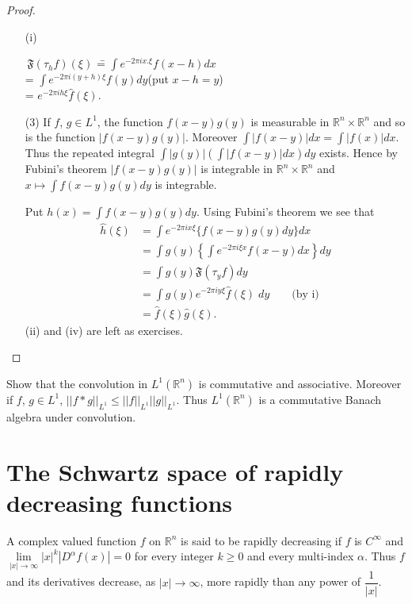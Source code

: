 \begin{proof}
\begin{itemize}
\item[\rm(i)]\pageoriginale
\begin{tabbing}
\,\qquad\quad$\mathfrak{F}(\tau_{h}f)(\xi)$ \== $\int e^{-2\pi
    ix.\xi}f(x-h)dx$\\[3pt]
\>= $\int e^{-2\pi i(y+h)\xi}f(y)dy$\quad (put $x-h=y$)\\[3pt]
\>= $e^{-2\pi ih \xi}\widehat{f}(\xi)$.
\end{tabbing}

(3) If $f$, $g\in L^{1}$, the function $f(x-y)g(y)$ is measurable in
$\mathbb{R}^{n}\times \mathbb{R}^{n}$ and so is the function
$|f(x-y)g(y)|$. Moreover $\int |f(x-y)|dx=\int  |f(x)|dx$. Thus the
repeated integral $\int |g(y)|(\int |f(x-y)|dx)dy$ exists. Hence by
Fubini's theorem $|f(x-y)g(y)|$ is integrable in $\mathbb{R}^{n}\times
  \mathbb{R}^{n}$ and $x\mapsto \int f(x-y)g(y)dy$ is integrable.

Put $h(x)=\int f(x-y)g(y)dy$. Using Fubini's theorem we see that
\begin{align*}
\widehat{h}(\xi) &= \int e^{-2\pi ix\xi}\{f(x-y)g(y)dy\}dx\\[3pt]
&= \int g(y)\left\{\int e^{-2\pi i \xi x}f(x-y)dx\right\}dy\\[3pt]
&= \int g(y)\mathfrak{F}(\tau_{y}f)dy\\[3pt]
&= \int g(y)e^{-2\pi iy\xi}\widehat{f}(\xi)\; dy\quad \text{~~ (by
  i)}\\[3pt]
&= \widehat{f}(\xi)\widehat{g}(\xi).
\end{align*}
(ii) and (iv) are left as exercises.
\end{itemize}
\end{proof}

\begin{exer*}
Show that the convolution in $L^{1}(\mathbb{R}^{n})$ is commutative
and associative. Moreover if $f$, $g\in L^{1}$, $||f\ast
g||_{L^{1}}\leq ||f||_{L^{1}}||g||_{L^{1}}$. Thus
$L^{1}(\mathbb{R}^{n})$ is a commutative Banach algebra under convolution.
\end{exer*}

\section*{The Schwartz space of rapidly decreasing functions}

A complex valued function $f$ on $\mathbb{R}^{n}$ is said to be
rapidly decreasing if $f$ is $C^{\infty}$ and $\lim\limits_{|x|\to
  \infty}|x|^{k}|D^{\alpha}f(x)|=0$ for every integer $k\geq 0$ and
every multi-index $\alpha$. Thus $f$ and its derivatives decrease, as
$|x|\to \infty$, more rapidly than any power of $\dfrac{1}{|x|}$.

